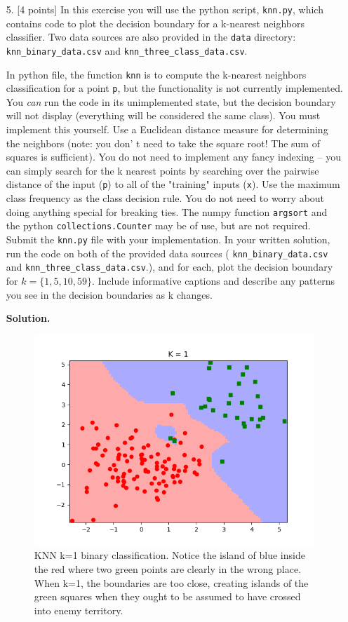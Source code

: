 \documentclass[10pt]{article}
\begin{document}
\begin{itemize}


\item[5.]  [4 points]
In this exercise you will use the python script, {\tt knn.py}, which contains code to plot the decision boundary for a k-nearest neighbors classifier.  Two data sources are also provided in the {\tt data} directory: {\tt knn\_binary\_data.csv} and {\tt knn\_three\_class\_data.csv}.

In python file, the function {\tt knn} is to compute the k-nearest neighbors classification for a point {\tt p}, but the functionality is not currently implemented.  You \emph{can} run the code in its unimplemented state, but the decision boundary will not display (everything will be considered the same class).  You must implement this yourself.  Use a Euclidean distance measure for determining the neighbors (note: you don' t need to take the square root! The sum of squares is sufficient).  You do not need to implement any fancy indexing -- you can simply search for the k nearest points by searching over the pairwise distance of the input ({\tt p}) to all of the "training" inputs ({\tt x}).  Use the maximum class frequency as the class decision rule.  You do not need to worry about doing anything special for breaking ties.  The numpy function {\tt argsort} and the python {\tt collections.Counter} may be of use, but are not required.  Submit the {\tt knn.py} file with your implementation.  In your written solution, run the code on both of the provided data sources ( {\tt knn\_binary\_data.csv} and {\tt knn\_three\_class\_data.csv}.), and for each, plot the decision boundary for $k = \{1, 5, 10, 59\}$.  Include informative captions and describe any patterns you see in the decision boundaries as k changes.

{\bf Solution.}

\begin{figure}[H]
\centering
  \includegraphics{code/knn_binary_data-k-1.png}
 \caption{KNN k=1 binary classification. Notice the island of blue inside the red where two green points are clearly in the wrong place. When k=1, the boundaries are too close, creating islands of the green squares when they ought to be assumed to have crossed into enemy territory.}
\end{figure}


\end{itemize}
\end{document}
